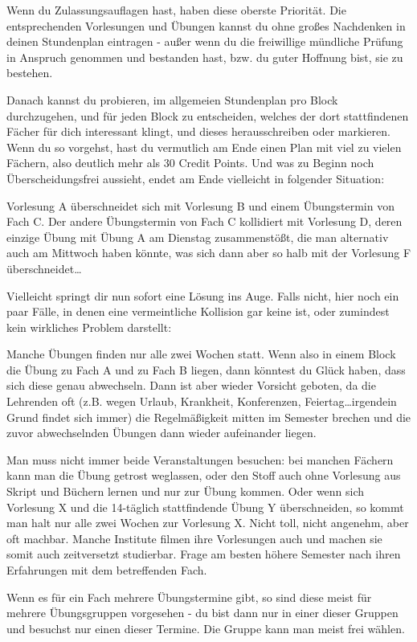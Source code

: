 \begin{multicols}{2}
Wenn du Zulassungsauflagen hast, haben diese oberste Priorität. Die entsprechenden Vorlesungen und Übungen kannst du ohne großes Nachdenken in deinen Stundenplan eintragen - außer wenn du die freiwillige mündliche Prüfung in Anspruch genommen und bestanden hast, bzw. du guter Hoffnung bist, sie zu bestehen.

Danach kannst du probieren, im allgemeien Stundenplan pro Block durchzugehen, und für jeden Block zu entscheiden, welches der dort stattfindenen Fächer für dich interessant klingt, und dieses herausschreiben oder markieren. Wenn du so vorgehst, hast du vermutlich am Ende einen Plan mit viel zu vielen Fächern, also deutlich mehr als 30 Credit Points. Und was zu Beginn noch Überscheidungsfrei aussieht, endet am Ende vielleicht in folgender Situation:

Vorlesung A überschneidet sich mit Vorlesung B und einem Übungstermin von Fach C. Der andere Übungstermin von Fach C kollidiert mit Vorlesung D, deren einzige Übung mit Übung A am Dienstag zusammenstößt, die man alternativ auch am Mittwoch haben könnte, was sich dann aber so halb mit der Vorlesung F überschneidet\ldots

Vielleicht springt dir nun sofort eine Lösung ins Auge. Falls nicht, hier noch ein paar Fälle, in denen eine vermeintliche Kollision gar keine ist, oder zumindest kein wirkliches Problem darstellt:

Manche Übungen finden nur alle zwei Wochen statt. Wenn also in einem Block die Übung zu Fach A und zu Fach B liegen, dann könntest du Glück haben, dass sich diese genau abwechseln. Dann ist aber wieder Vorsicht geboten, da die Lehrenden oft (z.B. wegen Urlaub, Krankheit, Konferenzen, Feiertag\ldots irgendein Grund findet sich immer) die Regelmäßigkeit mitten im Semester brechen und die zuvor abwechselnden Übungen dann wieder aufeinander liegen.

Man muss nicht immer beide Veranstaltungen besuchen: bei manchen Fächern kann man die Übung getrost weglassen, oder den Stoff auch ohne Vorlesung aus Skript und Büchern lernen und nur zur Übung kommen. Oder wenn sich Vorlesung X und die 14-täglich stattfindende Übung Y überschneiden, so kommt man halt nur alle zwei Wochen zur Vorlesung X. Nicht toll, nicht angenehm, aber oft machbar. Manche Institute filmen ihre Vorlesungen auch und machen sie somit auch zeitversetzt studierbar. Frage am besten höhere Semester nach ihren Erfahrungen mit dem betreffenden Fach.

Wenn es für ein Fach mehrere Übungstermine gibt, so sind diese meist für mehrere Übungsgruppen vorgesehen - du bist dann nur in einer dieser Gruppen und besuchst nur einen dieser Termine. Die Gruppe kann man meist frei wählen.


\end{multicols}
